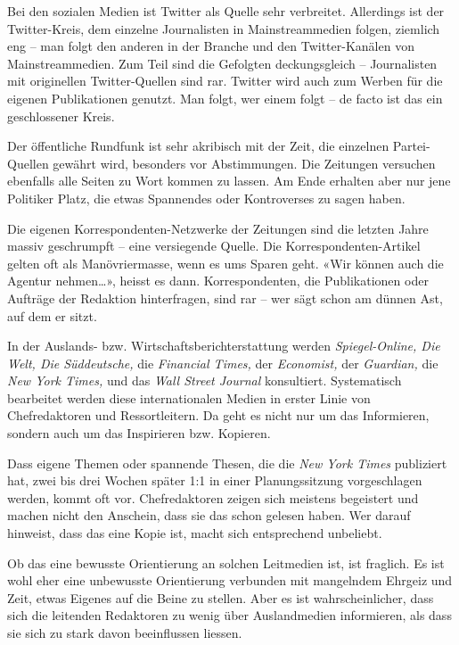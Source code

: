Bei den sozialen Medien ist Twitter als Quelle sehr verbreitet.
Allerdings ist der Twitter-Kreis, dem einzelne Journalisten in
Mainstreammedien folgen, ziemlich eng -- man folgt den anderen in der
Branche und den Twitter-Kanälen von Mainstreammedien. Zum Teil sind die
Gefolgten deckungsgleich -- Journalisten mit originellen Twitter-Quellen
sind rar. Twitter wird auch zum Werben für die eigenen Publikationen
genutzt. Man folgt, wer einem folgt -- de facto ist das ein
geschlossener Kreis.

Der öffentliche Rundfunk ist sehr akribisch mit der Zeit, die einzelnen
Partei-Quellen gewährt wird, besonders vor Abstimmungen. Die Zeitungen
versuchen ebenfalls alle Seiten zu Wort kommen zu lassen. Am Ende
erhalten aber nur jene Politiker Platz, die etwas Spannendes oder
Kontroverses zu sagen haben.

Die eigenen Korrespondenten-Netzwerke der Zeitungen sind die letzten
Jahre massiv geschrumpft -- eine versiegende Quelle. Die
Korrespondenten-Artikel gelten oft als Manövriermasse, wenn es ums
Sparen geht. «Wir können auch die Agentur nehmen\ldots{}», heisst es
dann. Korrespondenten, die Publikationen oder Aufträge der Redaktion
hinterfragen, sind rar -- wer sägt schon am dünnen Ast, auf dem er
sitzt.

In der Auslands- bzw. Wirtschaftsberichterstattung werden
\emph{Spiegel-Online, Die Welt, Die Süddeutsche,} die \emph{Financial
Times,} der \emph{Economist,} der \emph{Guardian,} die \emph{New York
Times,} und das \emph{Wall Street Journal} konsultiert. Systematisch
bearbeitet werden diese internationalen Medien in erster Linie von
Chefredaktoren und Ressortleitern. Da geht es nicht nur um das
Informieren, sondern auch um das Inspirieren bzw. Kopieren.

Dass eigene Themen oder spannende Thesen, die die \emph{New York Times}
publiziert hat, zwei bis drei Wochen später 1:1 in einer Planungssitzung
vorgeschlagen werden, kommt oft vor. Chefredaktoren zeigen sich meistens
begeistert und machen nicht den Anschein, dass sie das schon gelesen
haben. Wer darauf hinweist, dass das eine Kopie ist, macht sich
entsprechend unbeliebt.

Ob das eine bewusste Orientierung an solchen Leitmedien ist, ist
fraglich. Es ist wohl eher eine unbewusste Orientierung verbunden mit
mangelndem Ehrgeiz und Zeit, etwas Eigenes auf die Beine zu stellen.
Aber es ist wahrscheinlicher, dass sich die leitenden Redaktoren zu
wenig über Auslandmedien informieren, als dass sie sich zu stark davon
beeinflussen liessen.

